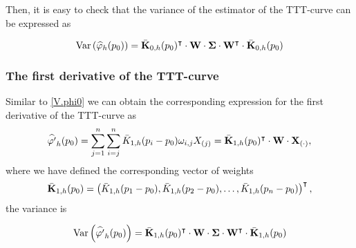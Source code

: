 \documentclass[preprint,12pt]{elsarticle}
\begin{document}
Then, it is easy to check that the variance of the estimator of the TTT-curve can be expressed as 

\begin{equation}\label{V.phi0}
{\rm Var} \left(\widehat{\varphi}_h(p_0)\right)= \bar{\bf K}_{0,h}(p_0)^{\intercal}\cdot {\bf W} \cdot {\boldsymbol{\Sigma}}\cdot  {\bf W}^{\intercal}\cdot \bar{\bf K}_{0,h}(p_0)
\end{equation}

%
%
%
%

\subsubsection*{The first derivative of the TTT-curve}


\noindent Similar to \eqref{V.phi0}  we can obtain the corresponding expression for the first derivative of the TTT-curve as
\begin{equation*}
\widehat{\varphi'}_h(p_0)=  \sum_{j=1}^n \sum_{i=j}^n \bar{K}_{1,h}(p_i-p_0)\omega_{i,j}X_{(j)}=\bar{\bf K}_{1,h}(p_0)^{\intercal} \cdot {\bf W} \cdot{\bf X}_{(\cdot)}, 
\end{equation*}
where we have defined the corresponding vector of weights 
$$\bar{\bf K}_{1,h}(p_0)=\left(\bar{ K}_{1,h}(p_1-p_0), \bar{ K}_{1,h}(p_2-p_0),\ldots,\bar{ K}_{1,h}(p_n-p_0)\right)^{\intercal},$$
the variance is 

\begin{equation}\label{V.phi1}
{\rm Var} \left(\widehat{\varphi'}_h(p_0)\right)= \bar{\bf K}_{1,h}(p_0)^{\intercal}\cdot {\bf W} \cdot {\boldsymbol{\Sigma}}\cdot  {\bf W}^{\intercal}\cdot \bar{\bf K}_{1,h}(p_0)
\end{equation}
%
%
\end{document}
